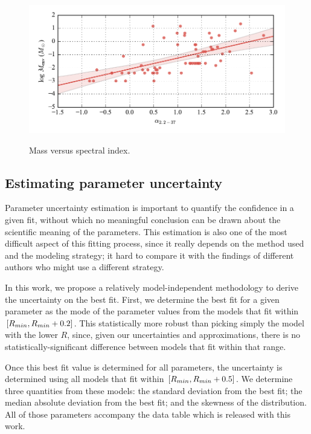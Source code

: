 \begin{figure}[!h]
\begin{center}
\includegraphics[width=\textwidth]{Figures/massVSalpha.pdf}
\label{fig:massVSalpha}
\vspace{-1cm}
\caption[Mass versus spectral index]{Mass versus spectral index.}
\end{center}
\end{figure}



\subsection{Estimating parameter uncertainty}

Parameter uncertainty estimation is important to quantify the confidence in a given fit, without which no meaningful conclusion can be drawn about the scientific meaning of the parameters. This estimation is also one of the most difficult aspect of this fitting process, since it really depends on the method used and the modeling strategy; it hard to compare it with the findings of different authors who might use a different strategy. 

In this work, we propose a relatively model-independent methodology to derive the uncertainty on the best fit. First, we determine the best fit for a given parameter as the mode of the parameter values from the models that fit within $[R_{min},R_{min}+0.2]$. This statistically more robust than picking simply the model with the lower $R$, since, given our uncertainties and approximations, there is no statistically-significant difference between models that fit within that range.

Once this best fit value is determined for all parameters, the uncertainty is determined using all models that fit within $[R_{min},R_{min}+0.5]$. We determine three quantities from these models: the standard deviation from the best fit; the median absolute deviation from the best fit; and the skewness of the distribution. All of those parameters accompany the data table which is released with this work.

